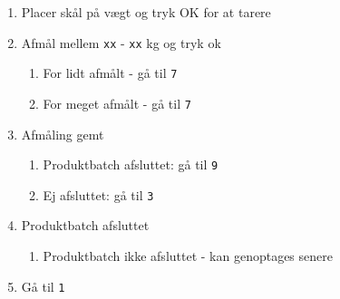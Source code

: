 \documentclass[a4paper]{article}
\begin{document}
\begin{enumerate}
\begin{enumerate}
    \end{enumerate}
  \item Placer skål på vægt og tryk OK for at tarere
  \item Afmål mellem \texttt{xx} - \texttt{xx} kg og tryk ok
    \begin{enumerate}
      \item For lidt afmålt - gå til \texttt{7}
      \item For meget afmålt - gå til \texttt{7}
    \end{enumerate}
  \item Afmåling gemt
    \begin{enumerate}
      \item Produktbatch afsluttet: gå til \texttt{9}
      \item Ej afsluttet: gå til \texttt{3}
    \end{enumerate}
  \item Produktbatch afsluttet
    \begin{enumerate}
      \item Produktbatch ikke afsluttet - kan genoptages senere
    \end{enumerate}
  \item Gå til \texttt{1}
\end{enumerate}


\end{document}
